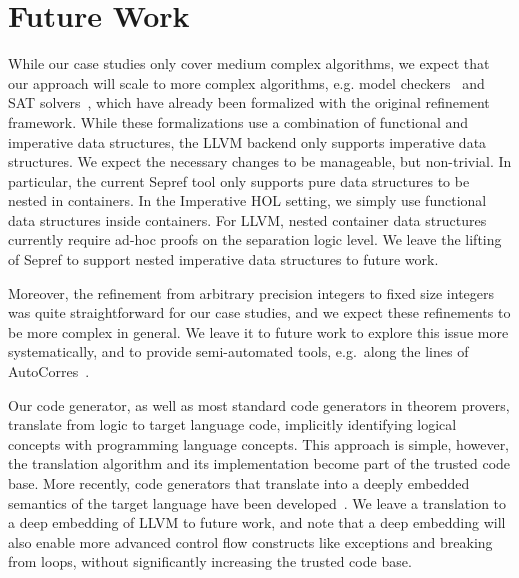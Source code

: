 \documentclass[a4paper,USenglish,cleveref, autoref]{lipics-v2019}
\begin{document}

\section{Future Work}\label{sec:future_work}
While our case studies only cover medium complex algorithms, we expect that our approach will scale to more complex algorithms, e.g.
model checkers~\cite{WiLa18,FBL18} and SAT solvers~\cite{FBL18}, which have already been formalized with the original refinement framework. 
While these formalizations use a combination of functional and imperative data structures, the LLVM backend only supports imperative data structures. 
We expect the necessary changes to be manageable, but non-trivial. 
In particular, the current Sepref tool only supports pure data structures to be nested in containers. In the Imperative HOL setting, we simply 
use functional data structures inside containers. For LLVM, nested container data structures currently require ad-hoc proofs on the separation logic level. We leave the lifting of Sepref to support nested imperative data structures to future work. 

Moreover, the refinement from arbitrary precision integers to fixed size integers was quite straightforward for our case studies, 
and we expect these refinements to be more complex in general.
We leave it to future work to explore this issue more systematically, and to provide semi-automated tools,
e.g.~along the lines of AutoCorres~\cite{GLAK14}.

Our code generator, as well as most standard code generators in theorem provers, 
translate from logic to target language code, implicitly identifying logical 
concepts with programming language concepts. This approach is simple, however, 
the translation algorithm and its implementation become part of the trusted code base.
More recently, code generators that translate into a deeply embedded semantics of the 
target language have been developed~\cite{MyOw14,HuNi18}. 
We leave a translation to a deep embedding of LLVM to future work, and note that a 
deep embedding will also enable more advanced control flow constructs like exceptions and breaking from loops, 
without significantly increasing the trusted code base.
\end{document}
